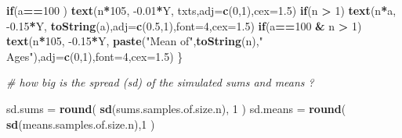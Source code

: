 \documentclass[]{book}
\newenvironment{Shaded}{\begin{snugshade}}{\end{snugshade}}
\newcommand{\CommentTok}[1]{\textcolor[rgb]{0.56,0.35,0.01}{\textit{#1}}}
\newcommand{\ControlFlowTok}[1]{\textcolor[rgb]{0.13,0.29,0.53}{\textbf{#1}}}
\newcommand{\DataTypeTok}[1]{\textcolor[rgb]{0.13,0.29,0.53}{#1}}
\newcommand{\DecValTok}[1]{\textcolor[rgb]{0.00,0.00,0.81}{#1}}
\newcommand{\FloatTok}[1]{\textcolor[rgb]{0.00,0.00,0.81}{#1}}
\newcommand{\KeywordTok}[1]{\textcolor[rgb]{0.13,0.29,0.53}{\textbf{#1}}}
\newcommand{\NormalTok}[1]{#1}
\newcommand{\OperatorTok}[1]{\textcolor[rgb]{0.81,0.36,0.00}{\textbf{#1}}}
\newcommand{\StringTok}[1]{\textcolor[rgb]{0.31,0.60,0.02}{#1}}
\begin{document}
\begin{Shaded}
\begin{Highlighting}[]
     \ControlFlowTok{if}\NormalTok{(a}\OperatorTok{==}\DecValTok{100}\NormalTok{ ) }\KeywordTok{text}\NormalTok{(n}\OperatorTok{*}\DecValTok{105}\NormalTok{, }\FloatTok{-0.01}\OperatorTok{*}\NormalTok{Y,}
\NormalTok{          txts,}\DataTypeTok{adj=}\KeywordTok{c}\NormalTok{(}\DecValTok{0}\NormalTok{,}\DecValTok{1}\NormalTok{),}\DataTypeTok{cex=}\FloatTok{1.5}\NormalTok{)}
     \ControlFlowTok{if}\NormalTok{(n }\OperatorTok{>}\StringTok{ }\DecValTok{1}\NormalTok{) }\KeywordTok{text}\NormalTok{(n}\OperatorTok{*}\NormalTok{a, }\FloatTok{-0.15}\OperatorTok{*}\NormalTok{Y, }\KeywordTok{toString}\NormalTok{(a),}\DataTypeTok{adj=}\KeywordTok{c}\NormalTok{(}\FloatTok{0.5}\NormalTok{,}\DecValTok{1}\NormalTok{),}\DataTypeTok{font=}\DecValTok{4}\NormalTok{,}\DataTypeTok{cex=}\FloatTok{1.5}\NormalTok{)}
     \ControlFlowTok{if}\NormalTok{(a}\OperatorTok{==}\DecValTok{100} \OperatorTok{&}\StringTok{ }\NormalTok{n }\OperatorTok{>}\StringTok{ }\DecValTok{1}\NormalTok{) }\KeywordTok{text}\NormalTok{(n}\OperatorTok{*}\DecValTok{105}\NormalTok{, }\FloatTok{-0.15}\OperatorTok{*}\NormalTok{Y,}
          \KeywordTok{paste}\NormalTok{(}\StringTok{"Mean of"}\NormalTok{,}\KeywordTok{toString}\NormalTok{(n),}\StringTok{" Ages"}\NormalTok{),}\DataTypeTok{adj=}\KeywordTok{c}\NormalTok{(}\DecValTok{0}\NormalTok{,}\DecValTok{1}\NormalTok{),}\DataTypeTok{font=}\DecValTok{4}\NormalTok{,}\DataTypeTok{cex=}\FloatTok{1.5}\NormalTok{)}
\NormalTok{   \}}
   
   \CommentTok{# how big is the spread (sd) of the simulated sums and means ?}
   
\NormalTok{   sd.sums  =}\StringTok{ }\KeywordTok{round}\NormalTok{( }\KeywordTok{sd}\NormalTok{(sums.samples.of.size.n), }\DecValTok{1}\NormalTok{ )}
\NormalTok{   sd.means =}\StringTok{ }\KeywordTok{round}\NormalTok{( }\KeywordTok{sd}\NormalTok{(means.samples.of.size.n),}\DecValTok{1}\NormalTok{ )}
   

\end{Highlighting}
\end{Shaded}
\end{document}
